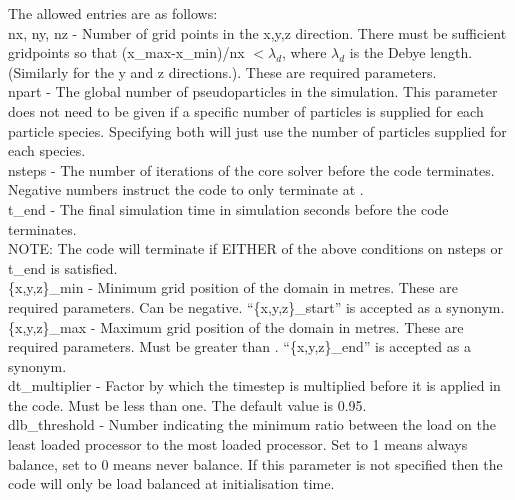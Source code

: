 The allowed entries are as follows:\\

{\emphtext nx, ny, nz} - Number of grid points in the x,y,z direction. There
must be sufficient gridpoints so that (x\_max-x\_min)/nx $< \lambda_d$, where
$\lambda_d$ is the Debye length. (Similarly for the y and z directions.).
These are required parameters.\\

{\emphtext npart} - The global number of pseudoparticles in the
simulation. This parameter does not need to be given if a specific number
of particles is supplied for each particle species. Specifying both will just
use the number of particles supplied for each species.\\

{\emphtext nsteps} - The number of iterations of the core solver before the
code terminates. Negative numbers instruct the code to only terminate at
.\\

{\emphtext t\_end} - The final simulation time in simulation seconds before the
code terminates.\\

{\emphtext NOTE: The code will terminate if EITHER of the above conditions on
nsteps or t\_end is satisfied.}\\

{\emphtext \{x,y,z\}\_min} - Minimum grid position of the domain in
metres. These are required parameters. Can be negative. ``\{x,y,z\}\_start''
is accepted as a synonym.\\

{\emphtext \{x,y,z\}\_max} - Maximum grid position of the domain in
metres. These are required parameters. Must be greater than
.  ``\{x,y,z\}\_end'' is accepted as a synonym.\\

{\emphtext dt\_multiplier} - Factor by which the timestep is multiplied before
it is applied in the code. Must be less than one. The default value is 0.95.\\

{\emphtext dlb\_threshold} - Number indicating the minimum ratio between the
load on the least loaded processor to the most loaded processor. Set to 1 means
always balance, set to 0 means never balance. If this parameter is not
specified then the code will only be load balanced at initialisation time.\\

